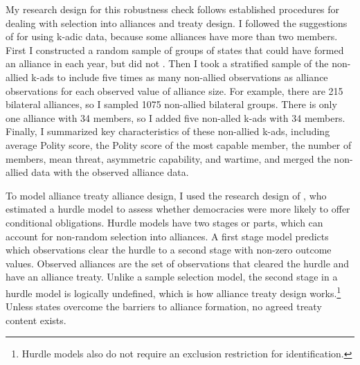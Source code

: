\documentclass[12pt]{article}
\begin{document}
My research design for this robustness check follows established procedures for dealing with selection into alliances and treaty design. 
I followed the suggestions of \citet{Poast2010} for using k-adic data, because some alliances have more than two members. 
First I constructed a random sample of groups of states that could have formed an alliance in each year, but did not \citep{FordhamPoast2014}.
Then I took a stratified sample of the non-allied k-ads to include five times as many non-allied observations as alliance observations for each observed value of alliance size. 
For example, there are 215 bilateral alliances, so I sampled 1075 non-allied bilateral groups. 
There is only one alliance with 34 members, so I added five non-alled k-ads with 34 members. 
Finally, I summarized key characteristics of these non-allied k-ads, including average Polity score, the Polity score of the most capable member, the number of members, mean threat, asymmetric capability, and wartime, and merged the non-allied data with the observed alliance data. 


To model alliance treaty alliance design, I used the research design of \citet{Chibaetal2015}, who estimated a hurdle model to assess whether democracies were more likely to offer conditional obligations.
Hurdle models have two stages or parts, which can account for non-random selection into alliances.
A first stage model predicts which observations clear the hurdle to a second stage with non-zero outcome values. 
Observed alliances are the set of observations that cleared the hurdle and have an alliance treaty. 
Unlike a sample selection model, the second stage in a hurdle model is logically undefined, which is how alliance treaty design works.\footnote{Hurdle models also do not require an exclusion restriction for identification.} 
Unless states overcome the barriers to alliance formation, no agreed treaty content exists. 
\end{document}
